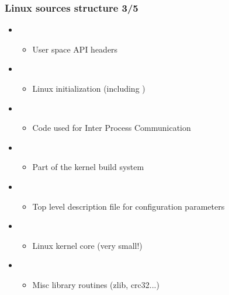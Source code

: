\begin{frame}
  \frametitle{Linux sources structure 3/5}
  \begin{itemize}
  \item {}
    \begin{itemize}
    \item User space API headers
    \end{itemize}
  \item {}
    \begin{itemize}
    \item Linux initialization (including )
    \end{itemize}
  \item {}
    \begin{itemize}
    \item Code used for Inter Process Communication
    \end{itemize}
  \item {}
    \begin{itemize}
    \item Part of the kernel build system
    \end{itemize}
  \item {}
    \begin{itemize}
    \item Top level description file for configuration parameters
    \end{itemize}
  \item {}
    \begin{itemize}
    \item Linux kernel core (very small!)
    \end{itemize}
  \item {}
    \begin{itemize}
    \item Misc library routines (zlib, crc32...)
    \end{itemize}
  \end{itemize}
\end{frame}

